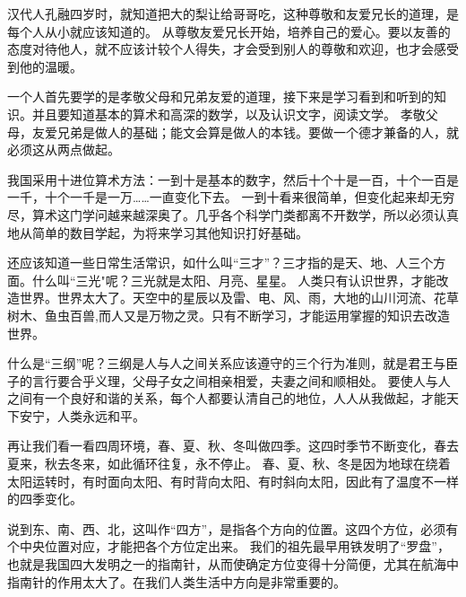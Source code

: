 \documentclass[avery5371,grid]{flashcards}
\begin{document}
{汉代人孔融四岁时，就知道把大的梨让给哥哥吃，这种尊敬和友爱兄长的道理，是每个人从小就应该知道的。} %
{从尊敬友爱兄长开始，培养自己的爱心。要以友善的态度对待他人，就不应该计较个人得失，才会受到别人的尊敬和欢迎，也才会感受到他的温暖。} %

{一个人首先要学的是孝敬父母和兄弟友爱的道理，接下来是学习看到和听到的知识。并且要知道基本的算术和高深的数学，以及认识文字，阅读文学。} %
{孝敬父母，友爱兄弟是做人的基础；能文会算是做人的本钱。要做一个德才兼备的人，就必须这从两点做起。} %

{我国采用十进位算术方法：一到十是基本的数字，然后十个十是一百，十个一百是一千，十个一千是一万……一直变化下去。} %
{一到十看来很简单，但变化起来却无穷尽，算术这门学问越来越深奥了。几乎各个科学门类都离不开数学，所以必须认真地从简单的数目学起，为将来学习其他知识打好基础。} %

{还应该知道一些日常生活常识，如什么叫“三才”？三才指的是天、地、人三个方面。什么叫“三光"呢？三光就是太阳、月亮、星星。} %
{人类只有认识世界，才能改造世界。世界太大了。天空中的星辰以及雷、电、风、雨，大地的山川河流、花草树木、鱼虫百兽,而人又是万物之灵。只有不断学习，才能运用掌握的知识去改造世界。} %

{什么是“三纲”呢？三纲是人与人之间关系应该遵守的三个行为准则，就是君王与臣子的言行要合乎义理，父母子女之间相亲相爱，夫妻之间和顺相处。} %
{要使人与人之间有一个良好和谐的关系，每个人都要认清自己的地位，人人从我做起，才能天下安宁，人类永远和平。} %

{再让我们看一看四周环境，春、夏、秋、冬叫做四季。这四时季节不断变化，春去夏来，秋去冬来，如此循环往复，永不停止。} %
{春、夏、秋、冬是因为地球在绕着太阳运转时，有时面向太阳、有时背向太阳、有时斜向太阳，因此有了温度不一样的四季变化。} %

{说到东、南、西、北，这叫作“四方”，是指各个方向的位置。这四个方位，必须有个中央位置对应，才能把各个方位定出来。} %
{我们的祖先最早用铁发明了“罗盘”，也就是我国四大发明之一的指南针，从而使确定方位变得十分简便，尤其在航海中指南针的作用太大了。在我们人类生活中方向是非常重要的。} %
\end{document}
